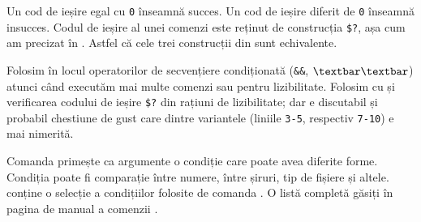 Un cod de ieșire egal cu \texttt{0} înseamnă succes.
Un cod de ieșire diferit de \texttt{0} înseamnă insucces.
Codul de ieșire al unei comenzi este reținut de construcția \texttt{\$?}, așa cum am precizat în .
Astfel că cele trei construcții din  sunt echivalente.


Folosim  în locul operatorilor de secvențiere condiționată (\texttt{\&\&}, \texttt{$\textbar\textbar$}) atunci când executăm mai multe comenzi sau pentru lizibilitate.
Folosim  cu  și verificarea codului de ieșire \texttt{\$?} din rațiuni de lizibilitate; dar e discutabil și probabil chestiune de gust care dintre variantele (liniile \texttt{3-5}, respectiv \texttt{7-10}) e mai nimerită.

Comanda  primește ca argumente o condiție care poate avea diferite forme.
Condiția poate fi comparație între numere, între șiruri, tip de fișiere și altele.
 conține o selecție a condițiilor folosite de comanda .
O listă completă găsiți în pagina de manual a comenzii .

